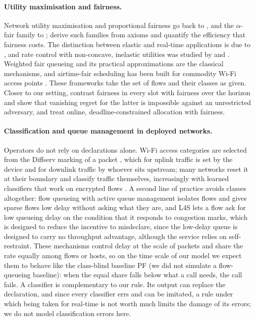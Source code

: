 \documentclass[preprint,11pt]{elsarticle}
\theoremstyle{definition}
\theoremstyle{remark}
\begin{document}
\paragraph{Utility maximisation and fairness.}
Network utility maximisation and proportional fairness go back to \citet{kelly1998rate}, and the $\alpha$-fair family to \citet{mo2000fair}; \citet{lan2010axiomatic} derive such families from axioms and \citet{bertsimas2011price} quantify the efficiency that fairness costs.
The distinction between elastic and real-time applications is due to \citet{shenker1995fundamental}, and rate control with non-concave, inelastic utilities was studied by \citet{lee2005nonconvex} and \citet{hande2007distributed}.
Weighted fair queueing and its practical approximations \citep{parekh1993generalized,shreedhar1996efficient} are the classical mechanisms, and airtime-fair scheduling has been built for commodity Wi-Fi access points \citep{hoiland2017ending}.
These frameworks take the set of flows and their classes as given.
Closer to our setting, \citet{sisalem2023enabling} contrast fairness in every slot with fairness over the horizon and show that vanishing regret for the latter is impossible against an unrestricted adversary, and \citet{elazzouni2020deadline} treat online, deadline-constrained allocation with fairness.

\paragraph{Classification and queue management in deployed networks.}
Operators do not rely on declarations alone.
Wi-Fi access categories are selected from the Diffserv marking of a packet \citep{rfc8325}, which for uplink traffic is set by the device and for downlink traffic by whoever sits upstream; many networks reset it at their boundary and classify traffic themselves, increasingly with learned classifiers that work on encrypted flows \citep{rezaei2019deep}.
A second line of practice avoids classes altogether: flow queueing with active queue management \citep{rfc8290,hoiland2018cake} isolates flows and gives sparse flows low delay without asking what they are, and L4S \citep{rfc9330} lets a flow ask for low queueing delay on the condition that it responds to congestion marks, which is designed to reduce the incentive to misdeclare, since the low-delay queue is designed to carry no throughput advantage, although the service relies on self-restraint.
These mechanisms control delay at the scale of packets and share the rate equally among flows or hosts, so on the time scale of our model we expect them to behave like the class-blind baseline \textsc{PF} (we did not simulate a flow-queueing baseline): when the equal share falls below what a call needs, the call fails.
A classifier is complementary to our rule. Its output can replace the declaration, and since every classifier errs and can be imitated, a rule under which being taken for real-time is not worth much limits the damage of its errors; we do not model classification errors here.
\end{document}
